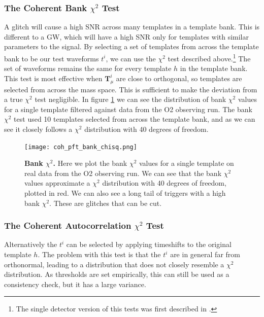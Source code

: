 \documentclass[11pt]{cuthesis}
\begin{document}
\subsubsection{The Coherent Bank $\chi^2$ Test}
A glitch will cause a high SNR across many templates in a template bank. This is different to a GW, which will have a high SNR only for templates with similar parameters to the signal. By selecting a set of templates from across the template bank to be our test waveforms $t^i$, we can use the $\chi^2$ test described above.\footnote{The single detector version of this tests was first described in \cite{hanna-thesis}.} The set of waveforms remains the same for every template $h$ in the template bank. This test is most effective when $\textbf{T}^i_\mu$ are close to orthogonal, so templates are selected from across the mass space. This is sufficient to make the deviation from a true $\chi^2$ test negligible. In figure \ref{fig:bankchi2} we can see the distribution of bank $\chi^2$ values for a single template filtered against data from the O2 observing run. The bank $\chi^2$ test used 10 templates selected from across the template bank, and as we can see it closely follows a $\chi^2$ distribution with 40 degrees of freedom.  

\begin{figure} %
\begin{center}
\texttt{[image: coh\_pft\_bank\_chisq.png]}
\end{center}
\caption{\textbf{Bank $\chi^2$.} Here we plot the bank $\chi^2$ values for a single template on real data from the O2 observing run. We can see that the bank $\chi^2$ values approximate a $\chi^2$ distribution with 40 degrees of freedom, plotted in red. We can also see a long tail of triggers with a high bank $\chi^2$. These are glitches that can be cut. }
\label{fig:bankchi2}
\end{figure}

\subsubsection{The Coherent Autocorrelation $\chi^2$ Test}
Alternatively the $t^i$ can be selected by applying timeshifts to the original template $h$. \cite{hanna-thesis} The problem with this test is that the $t^i$ are in general far from orthonormal, leading to a distribution that does not closely resemble a $\chi^2$ distribution. As thresholds are set empirically, this can still be used as a consistency check, but it has a large variance. \cite{pygrb_harry}
\end{document}
